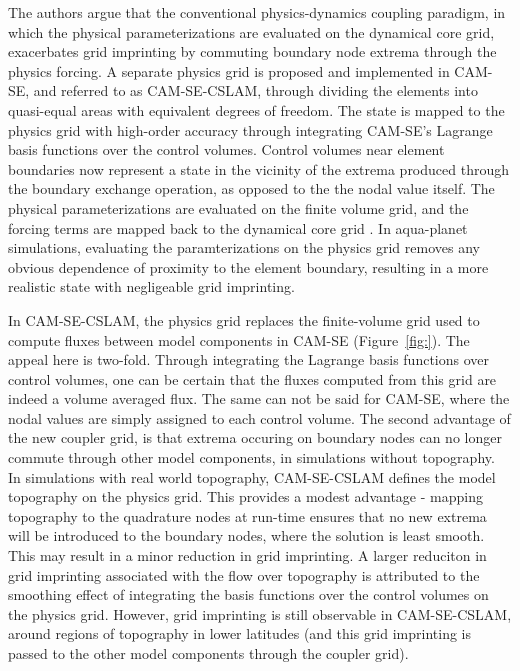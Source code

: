 \documentclass[twocol]{ametsoc}
\begin{document}
The authors argue that the conventional physics-dynamics coupling paradigm, in which the physical parameterizations are evaluated on the dynamical core grid, exacerbates grid imprinting by commuting boundary node extrema through the physics forcing. A separate physics grid is proposed and implemented in CAM-SE, and referred to as CAM-SE-CSLAM, through dividing the elements into quasi-equal areas with equivalent degrees of freedom. The state is mapped to the physics grid with high-order accuracy through integrating CAM-SE's Lagrange basis functions over the control volumes. Control volumes near element boundaries now represent a state in the vicinity of the extrema produced through the boundary exchange operation, as opposed to the the nodal value itself. The physical parameterizations are evaluated on the finite volume grid, and the forcing terms are mapped back to the dynamical core grid {\color{red}{discuss mapping back}}. In aqua-planet simulations, evaluating the paramterizations on the physics grid removes any obvious dependence of proximity to the element boundary, resulting in a more realistic state with negligeable grid imprinting.

In CAM-SE-CSLAM, the physics grid replaces the finite-volume grid used to compute fluxes between model components in CAM-SE (Figure~\ref{fig:}). The appeal here is two-fold. Through integrating the Lagrange basis functions over control volumes, one can be certain that the fluxes computed from this grid are indeed a volume averaged flux. The same can not be said for CAM-SE, where the nodal values are simply assigned to each control volume. The second advantage of the new coupler grid, is that extrema occuring on boundary nodes can no longer commute through other model components, in simulations without topography. In simulations with real world topography, CAM-SE-CSLAM defines the model topography on the physics grid. This provides a modest advantage - mapping topography to the quadrature nodes at run-time ensures that no new extrema will be introduced to the boundary nodes, where the solution is least smooth. This may result in a minor reduction in grid imprinting. A larger reduciton in grid imprinting associated with the flow over topography is attributed to the smoothing effect of integrating the basis functions over the control volumes on the physics grid. However, grid imprinting is still observable in CAM-SE-CSLAM, around regions of topography in lower latitudes (and this grid imprinting is passed to the other model components through the coupler grid). 
\end{document}
